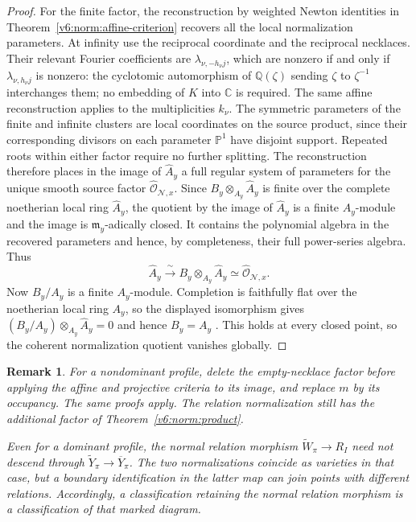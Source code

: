 \documentclass[10pt,fleqn]{article}
\numberwithin{equation}{section}
\newtheorem{remark}[theorem]{Remark}
\newcommand{\PP}{\mathbb P}
\begin{document}
\begin{proof}
For the finite factor, the reconstruction by weighted Newton
identities in Theorem~\ref{v6:norm:affine-criterion} recovers all
the local normalization parameters.  At infinity use the reciprocal
coordinate and the reciprocal necklaces.  Their relevant Fourier
coefficients are $\lambda_{\nu,-h_\nu j}$, which are nonzero if
and only if $\lambda_{\nu,h_\nu j}$ is nonzero: the cyclotomic
automorphism of $\mathbb Q(\zeta)$ sending $\zeta$ to $\zeta^{-1}$
interchanges them; no embedding of $K$ into $\mathbb C$ is required.
The same affine reconstruction applies to the multiplicities
$k_\nu$.  The symmetric parameters of the finite and infinite
clusters are local coordinates on the source product, since their
corresponding divisors on each parameter $\PP^1$ have disjoint
support.  Repeated roots within either factor require no further
splitting.  The reconstruction therefore places in the image of
$\widehat A_y$ a full regular system of parameters for the unique smooth
source factor $\widehat{\mathcal O}_{\mathcal N,x}$.  Since
$B_y\otimes_{A_y}\widehat A_y$ is finite over the complete noetherian local
ring $\widehat A_y$, the quotient by the image of $\widehat A_y$ is a
finite $\widehat A_y$-module and the image is $\mathfrak m_y$-adically
closed.  It contains the polynomial algebra in the recovered parameters and
hence, by completeness, their full power-series algebra.  Thus
\[
 \widehat A_y \xrightarrow{\;\sim\;}
 B_y\otimes_{A_y}\widehat A_y
 \simeq \widehat{\mathcal O}_{\mathcal N,x}.
\]
Now $B_y/A_y$ is a finite $A_y$-module.  Completion is faithfully flat over
the noetherian local ring $A_y$, so the displayed isomorphism gives
$(B_y/A_y)\otimes_{A_y}\widehat A_y=0$ and hence $B_y=A_y$
\cite[Tag 00MC]{Stacks}.  This holds at every closed point, so the coherent
normalization quotient vanishes globally.
\end{proof}

\begin{remark}\label{v6:norm:empty-and-marked}
For a nondominant profile, delete the empty-necklace factor before
applying the affine and projective criteria to its image, and replace
$m$ by its occupancy.  The same proofs apply.  The relation
normalization still has the additional factor of
Theorem~\ref{v6:norm:product}.

Even for a dominant profile, the normal relation morphism
$\widetilde W_\pi\longrightarrow R_I$ need not descend through
$\widetilde Y_\pi\longrightarrow\overline Y_\pi$.  The two
normalizations coincide as varieties in that case, but a boundary
identification in the latter map can join points with different
relations.  Accordingly, a classification retaining the normal
relation morphism is a classification of that marked diagram.
\end{remark}
\end{document}
